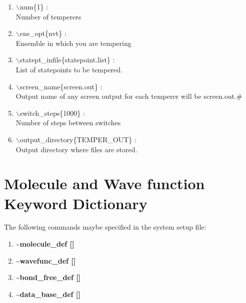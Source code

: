 \documentclass[12pt]{article}
\begin{document}
\begin{enumerate}

 \vspace{0.15in} 
 \item  $\backslash$num\{1\} : \\
   Number of temperers

 \vspace{0.15in} 
 \item  $\backslash$ens\_opt\{nvt\} : \\
   Ensemble in which you are tempering

 \vspace{0.15in} 
 \item  $\backslash$statept\_infile\{statepoint.list\} : \\
   List of statepoints to be tempered.

 \vspace{0.15in} 
 \item  $\backslash$screen\_name\{screen.out\} : \\
   Output name of any screen output for each temperer will be screen.out.\#

 \vspace{0.15in} 
 \item  $\backslash$switch\_steps\{1000\} : \\
   Number of steps between switches

 \vspace{0.15in} 
 \item  $\backslash$output\_directory\{TEMPER\_OUT\} : \\
   Output directory where files are stored.

\end{enumerate}
\newpage



\section*{\bf Molecule and Wave function Keyword Dictionary} 

The following commands maybe specified in the system setup file:
\begin{enumerate}
\item {\bf \~{}molecule\_def []}
\item {\bf \~{}wavefunc\_def []}
\item {\bf \~{}bond\_free\_def []}
\item {\bf \~{}data\_base\_def []}
\end{enumerate}
\end{document}
